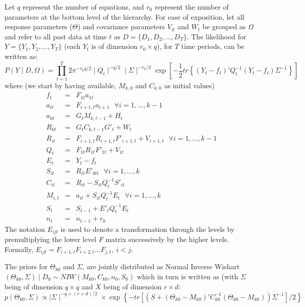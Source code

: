 \documentclass[11pt]{article} %
\begin{document}
Let $q$ represent the number of equations, and $r_0$ represent the number of parameters at 
the bottom level of the hierarchy.  For ease of exposition, let all response parameters ($\Theta$) and covariance parameters
$V_{it}$ and $W_t$ be grouped as $\Omega$ and refer to all past data at time $t$ as $D=\{D_1,D_2,\ldots,D_{T}\}$.  
The likelihood for $Y=\{Y_1,Y_2,\ldots,Y_T\}$ (each $Y_t$ is of dimension $r_0 \times q$), for $T$ time periods, can be written as:
\begin{equation}
P(Y \mid D,\Omega) = \prod_{t=1}^T 2 \pi^{-r_0q/2} \mid Q_t \mid^ {-q/2} \mid \Sigma \mid^{-r_0/2} 
\exp\left[ -\frac{1}{2} tr\left\{(Y_t - f_t)' Q_t^{-1} (Y_t - f_t) \Sigma^{-1}\right\}\right]
\end{equation}
where (we start by having available, $M_{k,0}$ and $C_{k,0}$ as initial values)
\begin{eqnarray}
f_t & = & F_{1t} a_{1t} \\
a_{it} & = & F_{i+1,t} a_{i+1} ~~~ \forall i=1,\ldots,k-1 \\
a_{kt} & = & G_t M_{k,t-1} + H_t\\
R_{kt} & = & G_t C_{k,t-1} G'_t + W_t\\
R_{it} & = & F_{i+1,t} R_{i+1,t} F'_{i+1,t} + V_{i+1,t} ~~~ \forall i=1,\ldots, k-1\\
Q_t & = & F_{1t} R_{1t} F'_{1t} + V_{1t}\\
E_t & = & Y_t - f_t \\
S_{it} & = & R_{it} E'_{0it}  ~~~ \forall i=1,\ldots, k\\
C_{it} & = & R_{it} - S_{it} Q_t^{-1} S'_{it} \\
M_{i,t} & = & a_{it} + S_{it} Q^{-1}_t E_t  ~~~ \forall i=1,\ldots, k\\
S_t & = & S_{t-1} + E'_t Q_t^{-1} E_t \\
n_t & = & n_{t-1} + r_0
\end{eqnarray}
The notation $E_{ijt}$ is used to denote a transformation through the levels
by premultiplying the lower level $F$ matrix successively by the higher levels.  
Formally, $E_{ijt} = F_{i+1,t} F_{i+2,t}\ldots F_{j,t}, ~ i<j$.  

The priors for $\Theta_{k0}$ and $\Sigma$, are jointly distributed
as Normal Inverse Wishart $(\Theta_{k0},\Sigma)\mid D_0 \sim NIW(M_{k0},C_{k0},n_0,S_0)$ which in turn is 
written as (with $\Sigma$ being of dimension $q\times q$ and $X$ being of dimension $r\times d$:
\begin{equation}
\label{eqn:NIW}
p(\Theta_{k0},\Sigma) \propto \mid \Sigma \mid ^{-q+(r+d)/2} \times \exp\left\{ -tr[(S+(\Theta_{k0}-M_{k0})' C_{k0}^{-1} (\Theta_{k0}-M_{k0}))\Sigma^{-1}]/2\right\}  
\end{equation}
\end{document}

